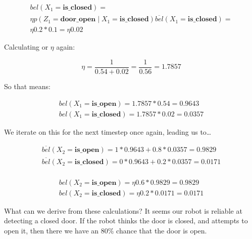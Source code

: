 \documentclass{article}
\begin{document}
\begin{equation}
    \begin{split}
        bel(X_1 = \textbf{is\_closed}) = \\
        \eta p(Z_1 = \textbf{door\_open} \mid X_1 = \textbf{is\_closed}) \overline{bel}(X_1 = \textbf{is\_closed}) = \\
        \eta 0.2 * 0.1 = \eta 0.02
    \end{split}
\end{equation}

Calculating or $\eta$ again:

\begin{equation}
    \eta = \frac{1}{0.54 + 0.02} = \frac{1}{0.56} = 1.7857
\end{equation}

So that means:

\begin{equation}
    \begin{split}
        bel(X_1 = \textbf{is\_open}) = 1.7857 * 0.54 = 0.9643 \\
        bel(X_1 = \textbf{is\_closed}) = 1.7857 * 0.02 = 0.0357
    \end{split}
\end{equation}

We iterate on this for the next timestep once again, leading us to\dots

\begin{equation}
    \begin{split}
        \overline{bel}(X_2=\textbf{is\_open}) = 1 * 0.9643 + 0.8 * 0.0357 = 0.9829 \\
        \overline{bel}(X_2=\textbf{is\_closed}) = 0 * 0.9643 + 0.2 * 0.0357 = 0.0171 \\
    \end{split}
\end{equation}

\begin{equation}
    \begin{split}
        bel(X_2 = \textbf{is\_open}) = \eta 0.6 * 0.9829 = 0.9829 \\
        bel(X_2 = \textbf{is\_closed}) = \eta 0.2 * 0.0171 = 0.0171
    \end{split}
\end{equation}

What can we derive from these calculations? It seems our robot is reliable at detecting a closed door. If the robot thinks the door is closed, and attempts to open it, then there we have an 80\% chance that the door is open.
\end{document}
